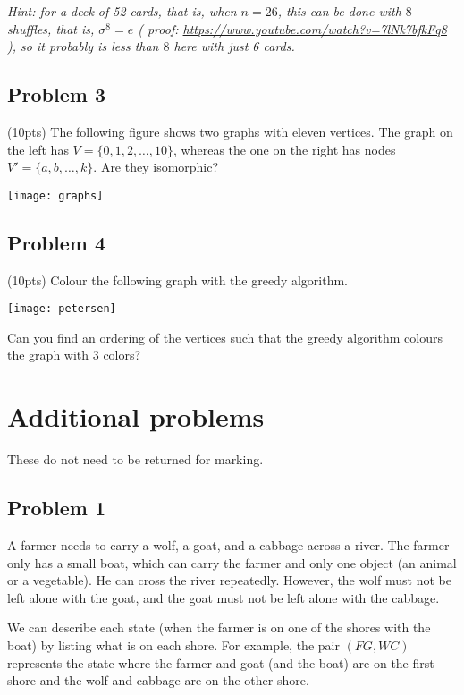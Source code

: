 \documentclass{amsart}
\theoremstyle{definition} \newtheorem*{definition}{Definition}
\theoremstyle{remark} \newtheorem*{ex}{Example}
\begin{document}
\textit{Hint: for a deck of 52 cards, that is, when $n = 26$, this can be done with $8$ shuffles, that is, $\sigma^8 = e$ ( proof: \url{https://www.youtube.com/watch?v=7lNk7bfkFq8} ), so it probably is less than $8$ here with just 6 cards.}

\subsection*{Problem 3} (10pts) The following figure shows two graphs with eleven vertices. The graph on the left has $V=\{0,1,2,\dots, 10\}$, whereas the one on the right has nodes $V'=\{a,b,\dots, k\}$. Are they isomorphic?
\begin{center}
\texttt{[image: graphs]}
\end{center}

\subsection*{Problem 4} (10pts) Colour the following graph with the greedy algorithm.
\begin{center}
\texttt{[image: petersen]}
\end{center}
Can you find an ordering of the vertices such that the greedy algorithm colours the graph with $3$ colors?





\section*{Additional problems}

These do not need to be returned for marking.

\subsection*{Problem 1}
A farmer needs to carry a wolf, a goat, and a cabbage across a river. The farmer only has a small boat, which can carry the farmer and only one object (an animal or a vegetable). He can cross the river repeatedly. However, the wolf must not be left alone with the goat, and the goat must not be left alone with the cabbage.

We can describe each state (when the farmer is on one of the shores with the boat) by listing what is on each shore. For example, the pair $(FG,WC)$ represents the state where the farmer and goat (and the boat) are on the first shore and the wolf and cabbage are
on the other shore.
\end{document}
